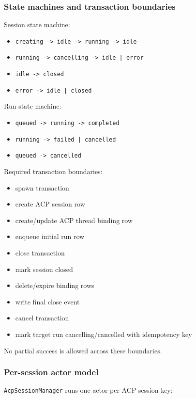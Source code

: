 \subsubsection{State machines and transaction boundaries}


Session state machine:

\begin{itemize}
  \item \texttt{creating -> idle -> running -> idle}
  \item \texttt{running -> cancelling -> idle | error}
  \item \texttt{idle -> closed}
  \item \texttt{error -> idle | closed}
\end{itemize}


Run state machine:

\begin{itemize}
  \item \texttt{queued -> running -> completed}
  \item \texttt{running -> failed | cancelled}
  \item \texttt{queued -> cancelled}
\end{itemize}


Required transaction boundaries:

\begin{itemize}
  \item spawn transaction
  \item create ACP session row
  \item create/update ACP thread binding row
  \item enqueue initial run row
  \item close transaction
  \item mark session closed
  \item delete/expire binding rows
  \item write final close event
  \item cancel transaction
  \item mark target run cancelling/cancelled with idempotency key
\end{itemize}


No partial success is allowed across these boundaries.

\subsubsection{Per-session actor model}


\texttt{AcpSessionManager} runs one actor per ACP session key:

